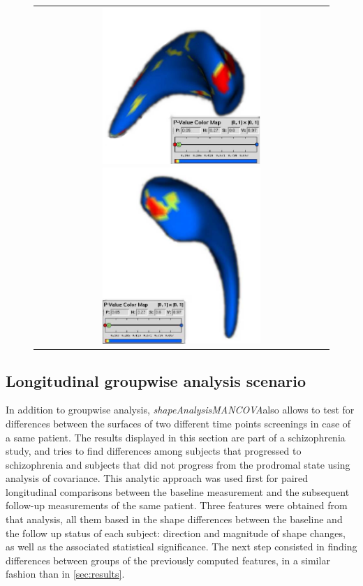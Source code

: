 \documentclass{InsightArticle}
\newcommand{\ProgramName}{\textit{shapeAnalysisMANCOVA}}
\begin{document}
\begin{figure}[htbp]
  \begin{center}
    \begin{tabular}[htbp]{c}
    \includegraphics[width=6cm]{IJ_AnalysisScenario1_RawPValues}
    \includegraphics[width=6cm]{IJ_AnalysisScenario1_Correlations}
    \end{tabular}
    \label{fig:rawP}
  \end{center}
\end{figure}

\subsection{Longitudinal groupwise analysis scenario}
\label{sec:results2}

In addition to groupwise analysis, \ProgramName also allows to test for differences between the surfaces of two different time points screenings in case of a same patient. The results displayed in this section are part of a schizophrenia study, and tries to find differences among subjects that progressed to schizophrenia and subjects that did not progress from the prodromal state using analysis of covariance. This analytic approach was used first for paired longitudinal comparisons between the baseline measurement and the subsequent follow-up measurements of the same patient. Three features were obtained from that analysis, all them based in the shape differences between the baseline and the follow up status of each subject: direction and magnitude of shape changes, as well as the associated statistical significance. The next step consisted in finding differences between groups of the previously computed features, in a similar fashion than in \ref{sec:results}. 
\end{document}
